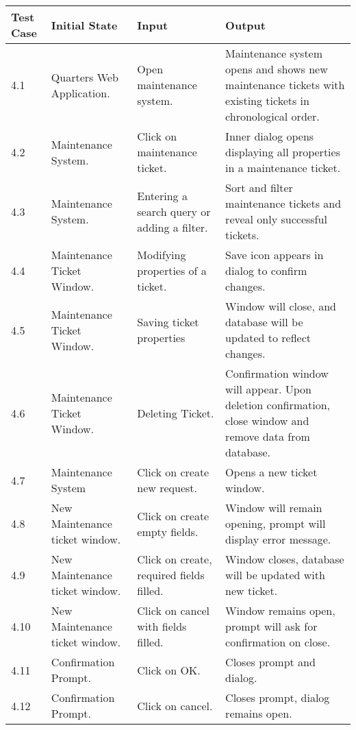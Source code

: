 \documentclass[12pt]{article}
\begin{document}
\begin{longtable}{|p{2cm}|p{3cm}|p{5cm}|p{5cm}|}
\hline
\textbf{Test Case}  & \textbf{Initial State} & \textbf{Input} & \textbf{Output} \\ \hline
4.1 & Quarters Web Application. & Open maintenance system. & Maintenance system opens and shows new maintenance tickets with existing tickets in chronological order. \\ 
\hline
4.2 & Maintenance System. & Click on maintenance ticket. & Inner dialog opens displaying all properties in a maintenance ticket. \\
\hline
4.3 & Maintenance System. & Entering a search query or adding a filter. & Sort and filter maintenance tickets and reveal only successful tickets. \\
\hline
4.4 & Maintenance Ticket Window. & Modifying properties of a ticket. & Save icon appears in dialog to confirm changes.\\
\hline
4.5 & Maintenance Ticket Window. & Saving ticket properties & Window will close, and database will be updated to reflect changes.\\
\hline
4.6 & Maintenance Ticket Window. & Deleting Ticket. & Confirmation window will appear. Upon deletion confirmation, close window and remove data from database.\\
\hline
4.7 & Maintenance System & Click on create new request. & Opens a new ticket window.\\
\hline
4.8 & New Maintenance ticket window. & Click on create empty fields. & Window will remain opening, prompt will display error message.\\
\hline
4.9 & New Maintenance ticket window. & Click on create, required fields filled. & Window closes, database will be updated with new ticket.\\
\hline
4.10 & New Maintenance ticket window. & Click on cancel with fields filled. & Window remains open, prompt will ask for confirmation on close.\\
\hline
4.11 & Confirmation Prompt. & Click on OK. & Closes prompt and dialog. \\
\hline
4.12 & Confirmation Prompt. & Click on cancel. & Closes prompt, dialog remains open.\\
\hline
\end{longtable}

\end{document}
